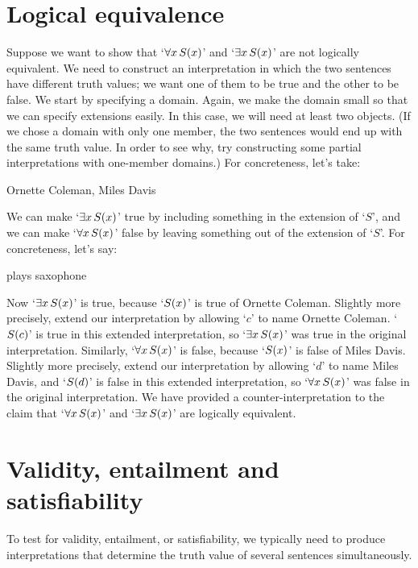 \section{Logical equivalence}
Suppose we want to show that `$\forall x\, \mathord{S}(x)$' and `$\exists x\, \mathord{S}(x)$' are not logically equivalent. We need to construct an interpretation in which the two sentences have different truth values; we want one of them to be true and the other to be false. We start by specifying a domain. Again, we make the domain small so that we can specify extensions easily. In this case, we will need at least two objects. (If we chose a domain with only one member, the two sentences would end up with the same truth value. In order to see why, try constructing some partial interpretations with one-member domains.) For concreteness, let's take:
	\begin{ekey}
		\item[\text{domain}] Ornette Coleman, Miles Davis
	\end{ekey}
We can make `$\exists x\, \mathord{S}(x)$' true by including something in the extension of `$S$', and we can make `$\forall x\, \mathord{S}(x)$' false by leaving something out of the extension of `$S$'. For concreteness, let's say:
	\begin{ekey}
		\item[\atom{S}{x}]  plays saxophone
	\end{ekey}
Now `$\exists x\, \mathord{S}(x)$' is true, because `$\mathord{S}(x)$' is true of Ornette Coleman. Slightly more precisely, extend our interpretation by allowing `$c$' to name Ornette Coleman.  `$\mathord{S}(c)$' is true in this extended interpretation, so `$\exists x\, \mathord{S}(x)$' was true in the original interpretation. Similarly, `$\forall x\, \mathord{S}(x)$' is false, because `$\mathord{S}(x)$' is false of Miles Davis. Slightly more precisely, extend our interpretation by allowing `$d$' to name Miles Davis, and `$\mathord{S}(d)$' is false in this extended interpretation, so `$\forall x\, \mathord{S}(x)$' was false in the original interpretation. We have provided a counter-interpretation to the claim that `$\forall x\, \mathord{S}(x)$' and `$\exists x\, \mathord{S}(x)$' are logically equivalent.

\section{Validity, entailment and satisfiability}
To test for validity, entailment, or satisfiability, we typically need to produce interpretations that determine the truth value of several sentences simultaneously. 

